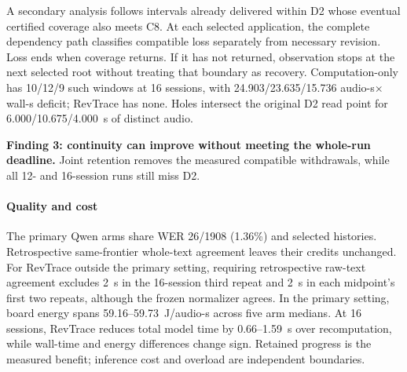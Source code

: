 A secondary analysis follows intervals already delivered within D2 whose
eventual certified coverage also meets C8. At each selected application,
the complete dependency path classifies compatible loss separately from
necessary revision. Loss ends when coverage returns. If it has not
returned, observation stops at the next selected root without treating
that boundary as recovery. Computation-only has 10/12/9
such windows at 16 sessions, with 24.903/23.635/15.736 audio-s$\times$wall-s
deficit; RevTrace has none. Holes intersect the original D2 read point
for 6.000/10.675/4.000~s of distinct audio.
\par\noindent\textbf{Finding 3: continuity can improve without meeting the whole-run deadline.}
Joint retention removes the measured compatible withdrawals, while all
12- and 16-session runs still miss D2.

\paragraph{Quality and cost}
The primary Qwen arms share WER 26/1908 (1.36\%) and selected histories.
Retrospective same-frontier whole-text agreement leaves their credits
unchanged. For RevTrace outside the primary setting, requiring retrospective raw-text
agreement excludes 2~s in the 16-session third repeat and 2~s in each
midpoint's first two repeats, although the frozen normalizer agrees.
In the primary setting, board energy spans 59.16--59.73~J/audio-s across
five arm medians. At 16 sessions, RevTrace reduces total
model time by 0.66--1.59~s over recomputation, while wall-time and energy
differences change sign. Retained progress is the measured benefit;
inference cost and overload are independent boundaries.
